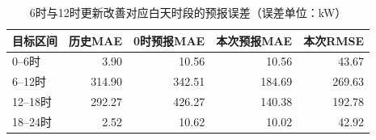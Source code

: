 \begin{table}[H]
\centering\small
\caption{6时与12时更新改善对应白天时段的预报误差（误差单位：kW）}
\label{tab:issued_forecast}
\begin{tabular}{lrrrr}\toprule
目标区间 & 历史MAE & 0时预报MAE & 本次预报MAE & 本次RMSE \\\midrule
0--6时 & 3.90 & 10.56 & 10.56 & 43.67 \\
6--12时 & 314.90 & 342.51 & 184.69 & 269.63 \\
12--18时 & 292.27 & 426.27 & 140.38 & 192.78 \\
18--24时 & 2.52 & 10.62 & 10.02 & 42.92 \\
\bottomrule\end{tabular}
\end{table}
